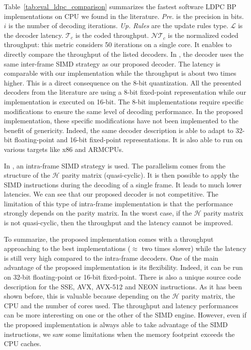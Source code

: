 Table~\ref{tab:eval_ldpc_comparison} summarizes the fastest software LDPC BP
implementations on CPU we found in the literature. \emph{Pre.} is the precision
in bits. $i$ is the number of decoding iterations. \emph{Up. Rules} are the
update rules type. $\mathcal{L}$ is the decoder latency. $\mathcal{T}_c$ is the
coded throughput. $\mathcal{NT}_c$ is the normalized coded throughput: this
metric considers 50 iterations on a single core. It enables to directly compare
the throughput of the listed decoders. In \cite{LeGal2016}, the decoder uses
the same inter-frame SIMD strategy as our proposed decoder. The latency is
comparable with our implementation while the throughput is about two times
higher. This is a direct consequence on the 8-bit quantization. All the
presented decoders from the literature are using a 8-bit fixed-point
representation while our implementation is executed on 16-bit. The 8-bit
implementations require specific modifications to ensure the same level of
decoding performance. In the proposed implementation, these specific
modifications have not been implemented to the benefit of genericity. Indeed,
the same decoder description is able to adapt to 32-bit floating-point and
16-bit fixed-point representations. It is also able to run on various targets
like x86 and ARM\R CPUs.

In \cite{LeGal2017,Xu2019}, an intra-frame SIMD strategy is used. The
parallelism comes from the structure of the $\mathcal{H}$ parity matrix
(quasi-cyclic). It is then possible to apply the SIMD instructions during the
decoding of a single frame. It leads to much lower latencies. We can see that
our proposed decoder is not competitive. The limitation of this type of
intra-frame implementation is that the performance strongly depends on the
parity matrix. In the worst case, if the $\mathcal{H}$ parity matrix is not
quasi-cyclic, then the throughput and the latency cannot be improved.

To summarize, the proposed implementation comes with a throughput approaching to
the best implementations ($\approx$ two times slower) while the latency is still
very high compared to the intra-frame decoders. One of the main advantage of the
proposed implementation is its flexibility. Indeed, it can be run on 32-bit
floating-point or 16-bit fixed-point. There is also a unique source code
description for the SSE, AVX, AVX-512 and NEON instructions. As it has been
shown before, this is valuable because depending on the $\mathcal{H}$ parity
matrix, the CPU and the number of cores used. The throughput and latency
performances can be more interesting on one or the other of the SIMD engine.
However, even if the proposed implementation is always able to take advantage of
the SIMD instructions, we saw some limitations when the memory footprint exceeds
the CPU caches.

